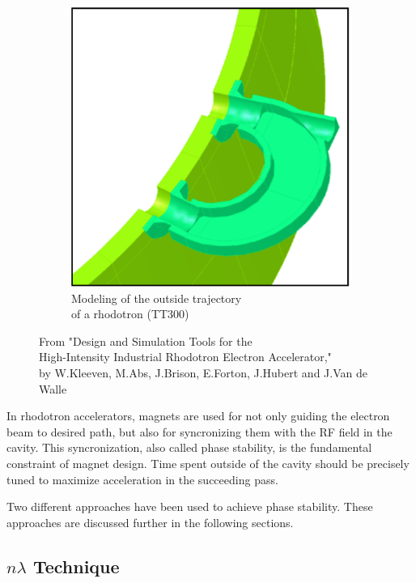 \documentclass[a4paper,oneside,12pt]{report}
\numberwithin{equation}{chapter}
\begin{document}
\begin{figure}[H]
\begin{subfigure}{.5\textwidth}
      \includegraphics[width=.9\linewidth]{./figures/design/tt300_mag.png}
      \caption{Modeling of the outside trajectory \\ of a rhodotron (TT300) \cite{cite:rhodo_design}}
    \end{subfigure}
    \caption{From "Design and Simulation Tools for the \\ High-Intensity Industrial Rhodotron Electron Accelerator," \\by W.Kleeven, M.Abs, J.Brison, E.Forton, J.Hubert and J.Van de Walle}
    \label{fig:magnet_design_illustrations}
\end{figure}
In rhodotron accelerators, magnets are used for not only guiding the electron beam to desired path, but also for syncronizing them with the RF field in the cavity. 
This syncronization, also called phase stability, is the fundamental constraint of magnet design. 
Time spent outside of the cavity should be precisely tuned to maximize acceleration in the succeeding pass. 

Two different approaches have been used to achieve phase stability.
These approaches are discussed further in the following sections.

\subsection{$n\lambda$ Technique} \label{sec:n_L_technique}
\end{document}
